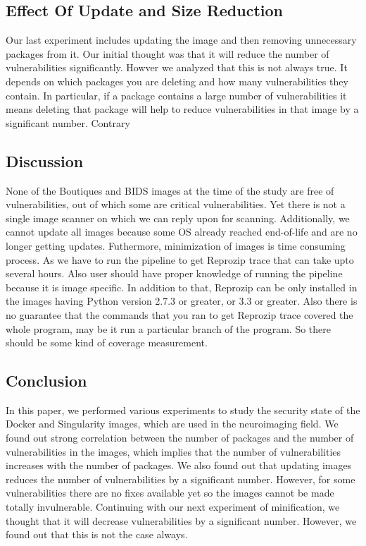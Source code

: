 \documentclass[a4paper,num-refs]{oup-contemporary}
\begin{document}
\subsection{Effect Of Update and Size Reduction}

Our last experiment includes updating the image and then removing unnecessary packages from it.
Our initial thought was that it will reduce the number of vulnerabilities significantly. Howver
we analyzed that this is not always true. It depends on which packages you are deleting and how
many vulnerabilities they contain. In particular, if a package contains a large number of vulnerabilities
it means deleting that package will help to reduce vulnerabilities in that image by a significant number.
Contrary 


\subsection{Discussion}

None of the Boutiques and BIDS images at the time of the study are free of vulnerabilities, out of which
some are critical vulnerabilities. Yet there is not a single image scanner on which we can reply upon for
scanning. Additionally, we cannot update all images because some OS already reached end-of-life and are
no longer getting updates. Futhermore, minimization of images is time consuming process. As we have to run
the pipeline to get Reprozip trace that can take upto several hours. Also user should have proper knowledge
of running the pipeline because it is image specific. In addition to that, Reprozip can be only installed
in the images having Python version 2.7.3 or greater, or 3.3 or greater. Also there is no guarantee that
the commands that you ran to get Reprozip trace covered the whole program, may be it run a particular
branch of the program. So there should be some kind of coverage measurement.

\subsection{Conclusion}

In this paper, we performed various experiments to study the security state of the Docker
and Singularity images, which are used in the neuroimaging field. We found out strong correlation
between the number of packages and the number of vulnerabilities in the images, which implies
that the number of vulnerabilities increases with the number of packages. We also found out that
updating images reduces the number of vulnerabilities by a significant number. However, for some
vulnerabilities there are no fixes available yet so the images cannot 
be made totally invulnerable. Continuing with our next experiment of minification, we thought that
it will decrease vulnerabilities by a significant number. However, we found out that this is not
the case always.


\end{document}
